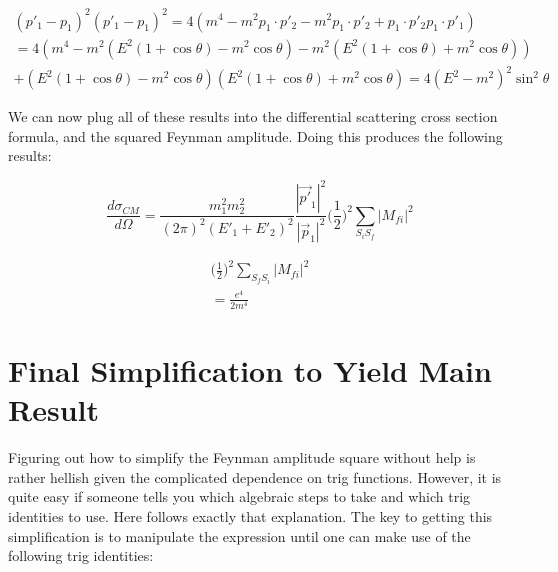 \documentclass[a4]{article}
\begin{document}
    \begin{eqnarray}
        (p'_1 - p_1)^2 (p'_1 - p_1)^2 = 4 (m^4 - m^2 p_1 \cdot p'_2 - m^2 p_1 \cdot p'_2 + p_1 \cdot p'_2 p_1 \cdot p'_1) \\
        = 4 (m^4 - m^2 (E^2 (1 + \cos \theta) - m^2 \cos \theta) - m^2 (E^2 (1 + \cos \theta) + m^2 \cos \theta) ) \\
        + (E^2 (1 + \cos \theta) - m^2 \cos \theta) (E^2 (1 + \cos \theta) + m^2 \cos \theta) = 4 (E^2 - m^2)^2 \sin^2 \theta 
    \end{eqnarray}

    We can now plug all of these results into the differential scattering cross section formula, and the squared Feynman amplitude. Doing this produces the following results:

    \begin{equation}
        \frac{d \sigma_{CM}}{d \Omega} = \frac{m_1^2 m_2^2}{(2 \pi)^2 (E'_1 + E'_2)^2} \frac{|\vec{p'}_1|^2}{|\vec{p}_1|^2} \bigg( \frac{1}{2} \bigg)^2 \sum_{S_i S_f} |M_{fi}|^2
    \end{equation}

    \begin{eqnarray}
        \bigg( \frac{1}{2} \bigg)^2 \sum_{S_f S_i} |M_{f i}|^2 \\
        = \frac{e^4}{2 m^4}
    \end{eqnarray}

    \section*{Final Simplification to Yield Main Result}

    Figuring out how to simplify the Feynman amplitude square without help is rather hellish given the complicated dependence on trig functions. However, it is quite easy if someone tells you which algebraic steps to take and which trig identities
    to use. Here follows exactly that explanation. The key to getting this simplification is to manipulate the expression until one can make use of the following trig identities:
\end{document}

